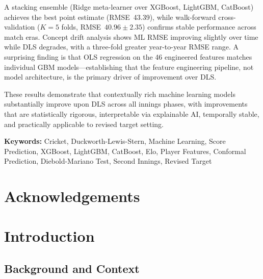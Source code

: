 \documentclass[12pt,a4paper,oneside]{report}
\begin{document}
A stacking ensemble (Ridge meta-learner over XGBoost, LightGBM, CatBoost) achieves the best point estimate (RMSE~43.39), while walk-forward cross-validation ($K=5$ folds, RMSE~$40.96 \pm 2.35$) confirms stable performance across match eras.  Concept drift analysis shows ML RMSE improving slightly over time while DLS degrades, with a three-fold greater year-to-year RMSE range.  A surprising finding is that OLS regression on the 46 engineered features matches individual GBM models---establishing that the feature engineering pipeline, not model architecture, is the primary driver of improvement over DLS.

These results demonstrate that contextually rich machine learning models substantially improve upon DLS across all innings phases, with improvements that are statistically rigorous, interpretable via explainable AI, temporally stable, and practically applicable to revised target setting.

\textbf{Keywords:} Cricket, Duckworth-Lewis-Stern, Machine Learning, Score Prediction, XGBoost, LightGBM, CatBoost, Elo, Player Features, Conformal Prediction, Diebold-Mariano Test, Second Innings, Revised Target

\chapter*{Acknowledgements}

\vspace*{\fill}

\tableofcontents
\listoffigures
\listoftables

\chapter{Introduction}
\label{ch:introduction}

\section{Background and Context}
\end{document}
